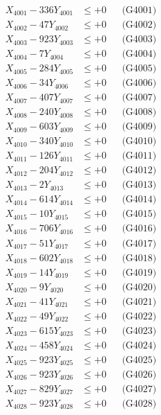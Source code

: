 \documentclass[a4paper,10pt]{article}
\begin{document}
{\begin{align}
\allowbreak
X_{4001} - 336Y_{4001} &\leq +0 && \text{(G4001)} \\
X_{4002} - 47Y_{4002} &\leq +0 && \text{(G4002)} \\
X_{4003} - 923Y_{4003} &\leq +0 && \text{(G4003)} \\
X_{4004} - 7Y_{4004} &\leq +0 && \text{(G4004)} \\
X_{4005} - 284Y_{4005} &\leq +0 && \text{(G4005)} \\
X_{4006} - 34Y_{4006} &\leq +0 && \text{(G4006)} \\
X_{4007} - 407Y_{4007} &\leq +0 && \text{(G4007)} \\
X_{4008} - 240Y_{4008} &\leq +0 && \text{(G4008)} \\
X_{4009} - 603Y_{4009} &\leq +0 && \text{(G4009)} \\
X_{4010} - 340Y_{4010} &\leq +0 && \text{(G4010)} \\
\allowbreak
X_{4011} - 126Y_{4011} &\leq +0 && \text{(G4011)} \\
X_{4012} - 204Y_{4012} &\leq +0 && \text{(G4012)} \\
X_{4013} - 2Y_{4013} &\leq +0 && \text{(G4013)} \\
X_{4014} - 614Y_{4014} &\leq +0 && \text{(G4014)} \\
X_{4015} - 10Y_{4015} &\leq +0 && \text{(G4015)} \\
X_{4016} - 706Y_{4016} &\leq +0 && \text{(G4016)} \\
X_{4017} - 51Y_{4017} &\leq +0 && \text{(G4017)} \\
X_{4018} - 602Y_{4018} &\leq +0 && \text{(G4018)} \\
X_{4019} - 14Y_{4019} &\leq +0 && \text{(G4019)} \\
X_{4020} - 9Y_{4020} &\leq +0 && \text{(G4020)} \\
\allowbreak
X_{4021} - 41Y_{4021} &\leq +0 && \text{(G4021)} \\
X_{4022} - 49Y_{4022} &\leq +0 && \text{(G4022)} \\
X_{4023} - 615Y_{4023} &\leq +0 && \text{(G4023)} \\
X_{4024} - 458Y_{4024} &\leq +0 && \text{(G4024)} \\
X_{4025} - 923Y_{4025} &\leq +0 && \text{(G4025)} \\
X_{4026} - 923Y_{4026} &\leq +0 && \text{(G4026)} \\
X_{4027} - 829Y_{4027} &\leq +0 && \text{(G4027)} \\
X_{4028} - 923Y_{4028} &\leq +0 && \text{(G4028)} \\

\end{align}}
\end{document}
